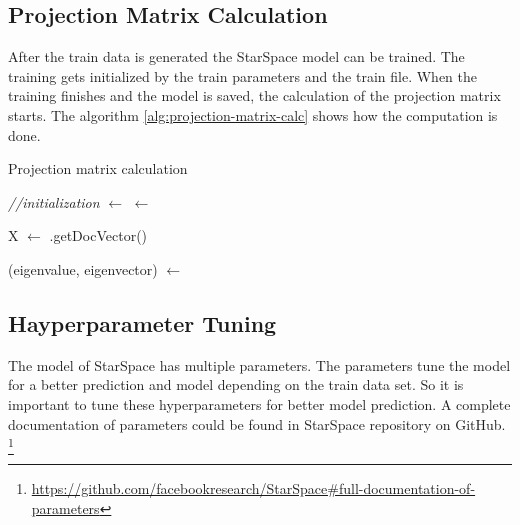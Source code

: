 \subsection{Projection Matrix Calculation}
\label{subsec:projection-matrix-calculation}
After the train data is generated the StarSpace model can be trained. The training gets initialized by the train parameters and the train file. When the training finishes and the model is saved, the calculation of the projection matrix starts. The algorithm \ref{alg:projection-matrix-calc} shows how the computation is done.

\begin{algorithm}[H]
    \caption{Projection matrix calculation}
    \label{alg:projection-matrix-calc}




    \SetAlgoLined

    \BlankLine\emph{//initialization}\BlankLine
    \model $\leftarrow$ \loadModel{}\;
    \allSentences $\leftarrow$ \getAllSentencesFromTrainDataset{}\;

    \BlankLine

     { X $\leftarrow$ \model.getDocVector(\sen) }

	(eigenvalue, eigenvector) $\leftarrow$ 

    \BlankLine
\end{algorithm}


\subsection{Hayperparameter Tuning}
\label{subsec:hyperparameter-tuning}
The model of StarSpace has multiple parameters. The parameters tune the model for a better prediction and model depending on the train data set. So it is important to tune these hyperparameters for better model prediction. A complete documentation of parameters could be found in StarSpace repository on GitHub. \footnote{\url{https://github.com/facebookresearch/StarSpace\#full-documentation-of-parameters}}

